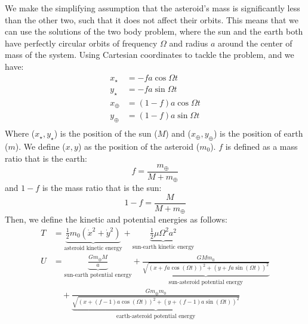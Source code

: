 \documentclass[11pt]{article}
\begin{document}
We make the simplifying assumption that the asteroid's mass is significantly less than the other two, such that it does not affect their orbits. This means that we can use the solutions of the two body problem, where the sun and the earth both have perfectly circular orbits of frequency $\Omega$ and radius $a$ around the center of mass of the system. Using Cartesian coordinates to tackle the problem, and we have: 
\begin{align}
    x_\star &= -fa\cos\Omega t \\
    y_\star &= -fa\sin\Omega t \\
    x_\oplus &= (1-f)a\cos\Omega t \\
    y_\oplus &= (1-f)a\sin\Omega t \\
\end{align}
Where ($x_\star, y_\star$) is the position of the sun ($M$) and ($x_\oplus, y_\oplus$) is the position of earth ($m$). We define ($x, y$) as the position of the asteroid ($m_0$). $f$ is defined as a mass ratio that is the earth:
\begin{equation}
    f = \frac{m_\oplus}{M+m_\oplus}
\end{equation}
and $1-f$ is the mass ratio that is the sun:
\begin{equation}
    1-f = \frac{M}{M+m_\oplus}
\end{equation}
\noindent
Then, we define the kinetic and potential energies as follows:
\begin{align}
    T &= \underbrace{\frac{1}{2}m_{0} (\dot x ^2 + \dot y ^2)}_\text{asteroid kinetic energy} + \underbrace{\frac{1}{2}\mu \Omega^{2} a^{2}}_\text{sun-earth kinetic energy} \\
    U &= \underbrace{\frac{Gm_\oplus M}{a}}_\text{sun-earth potential energy} + \underbrace{\frac{G M m_{0}}{\sqrt{(x+fa\cos(\Omega t))^2 +(y+fa\sin(\Omega t))^2}}}_\text{sun-asteroid potential energy} \nonumber \\
    & \quad +\underbrace{\frac{G m_\oplus m_{0}}{\sqrt{(x+(f-1)a\cos(\Omega t))^2 +(y+(f-1)a\sin(\Omega t))^2}}}_\text{earth-asteroid potential energy}
\end{align}
\end{document}
